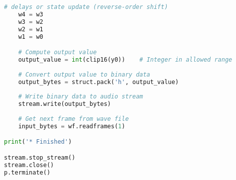 \documentclass[11pt]{article}
\begin{document}
\begin{lstlisting}[language=python, label={lst:code}, breaklines=true, caption={example code}]
    # delays or state update (reverse-order shift)
    w4 = w3
    w3 = w2
    w2 = w1
    w1 = w0

    # Compute output value
    output_value = int(clip16(y0))    # Integer in allowed range
    
    # Convert output value to binary data
    output_bytes = struct.pack('h', output_value)
    
    # Write binary data to audio stream
    stream.write(output_bytes)
    
    # Get next frame from wave file
    input_bytes = wf.readframes(1)

print('* Finished')

stream.stop_stream()
stream.close()
p.terminate()

\end{lstlisting}    
    
\end{document}
